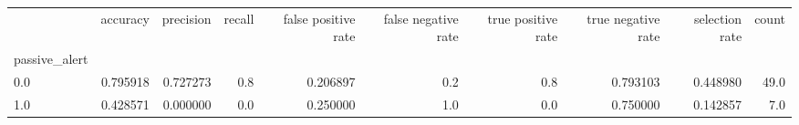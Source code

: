 \begin{tabular}{lrrrrrrrrr}
\toprule
{} &  accuracy &  precision &  recall &  false positive rate &  false negative rate &  true positive rate &  true negative rate &  selection rate &  count \\
passive\_alert &           &            &         &                      &                      &                     &                     &                 &        \\
\midrule
0.0           &  0.795918 &   0.727273 &     0.8 &             0.206897 &                  0.2 &                 0.8 &            0.793103 &        0.448980 &   49.0 \\
1.0           &  0.428571 &   0.000000 &     0.0 &             0.250000 &                  1.0 &                 0.0 &            0.750000 &        0.142857 &    7.0 \\
\bottomrule
\end{tabular}
